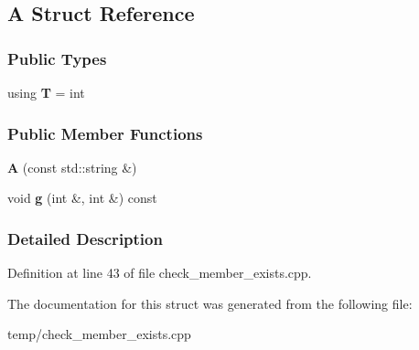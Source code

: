 \hypertarget{structA}{}\subsection{A Struct Reference}
\label{structA}
\subsubsection*{Public Types}
\begin{DoxyCompactItemize}
\item 
using {\bfseries T} = int\hypertarget{structA_aa18880f9ad2011053c7731a261d765c6}{}\label{structA_aa18880f9ad2011053c7731a261d765c6}

\end{DoxyCompactItemize}
\subsubsection*{Public Member Functions}
\begin{DoxyCompactItemize}
\item 
{\bfseries A} (const std\+::string \&)\hypertarget{structA_af4e3820e4a3e22264af32afee07392a4}{}\label{structA_af4e3820e4a3e22264af32afee07392a4}

\item 
void {\bfseries g} (int \&, int \&) const \hypertarget{structA_a83b5c8eae282f1e7715c418f2f768ba9}{}\label{structA_a83b5c8eae282f1e7715c418f2f768ba9}

\end{DoxyCompactItemize}


\subsubsection{Detailed Description}


Definition at line 43 of file check\+\_\+member\+\_\+exists.\+cpp.



The documentation for this struct was generated from the following file\+:\begin{DoxyCompactItemize}
\item 
temp/check\+\_\+member\+\_\+exists.\+cpp\end{DoxyCompactItemize}
